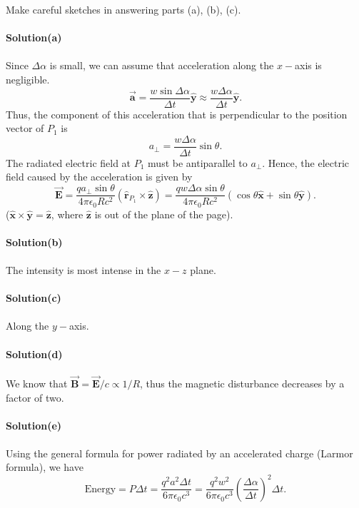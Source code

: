 \documentclass[12pt,a4paper]{article}
\begin{document}
Make careful sketches in answering parts (a), (b), (c).
\\
\\\textbf{Solution(a)}
\\
\\Since $\Delta\alpha$ is small, we can assume that acceleration along the $x-$axis is negligible.
\[\boldsymbol{\vec{a}}=\frac{w\sin\Delta\alpha}{\Delta t}\boldsymbol{\hat{y}}\approx\frac{w\Delta\alpha}{\Delta t}\boldsymbol{\hat{y}}.\]
Thus, the component of this acceleration that is perpendicular to the position vector of $P_1$ is
\[a_{\perp}=\frac{w\Delta\alpha}{\Delta t}\sin\theta.\]
The radiated electric field at $P_1$ must be antiparallel to $a_{\perp}$. Hence, the electric field caused by the acceleration is given by
\[\boldsymbol{\vec{E}}=\frac{qa_{\perp}\sin\theta}{4\pi\epsilon_0Rc^2}(\boldsymbol{\hat{r}}_{P_1}\times\boldsymbol{\hat{z}})=\frac{qw\Delta\alpha\sin\theta}{4\pi\epsilon_0Rc^2}(\cos\theta\boldsymbol{\hat{x}}+\sin\theta\boldsymbol{\hat{y}}).\]
($\boldsymbol{\hat{x}}\times\boldsymbol{\hat{y}}=\boldsymbol{\hat{z}}$, where $\boldsymbol{\hat{z}}$ is out of the plane of the page).
\\
\\\textbf{Solution(b)}
\\
\\The intensity is most intense in the $x-z$ plane.
\\
\\\textbf{Solution(c)}
\\
\\Along the $y-$axis.
\\
\\\textbf{Solution(d)}
\\
\\We know that $\boldsymbol{\vec{B}}=\boldsymbol{\vec{E}}/c\propto1/R$, thus the magnetic disturbance decreases by a factor of two.
\\
\\\textbf{Solution(e)}
\\
\\Using the general formula for power radiated by an accelerated charge (Larmor formula), we have
\[\text{Energy}=P\Delta t=\frac{q^2a^2\Delta t}{6\pi\epsilon_0c^3}=\frac{q^2w^2}{6\pi\epsilon_0c^3}\left(\frac{\Delta\alpha}{\Delta t}\right)^2\Delta t.\]
\end{document}
